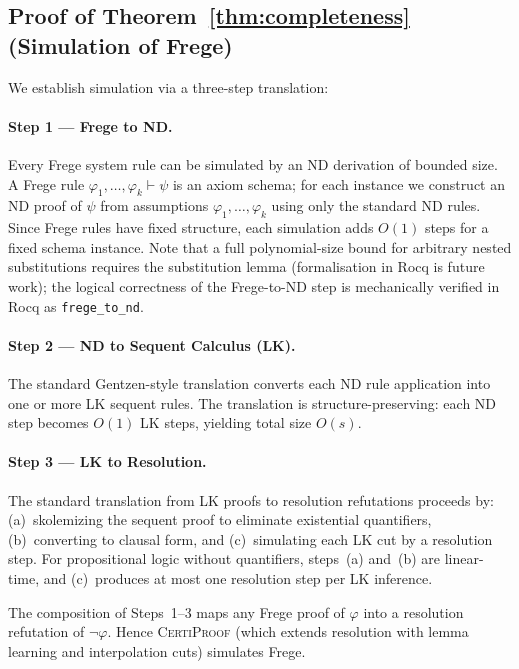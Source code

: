 \documentclass[acmtocl,review,anonymous]{acmart}
\newcommand{\CP}{\textsc{CertiProof}}
\begin{document}
\subsection{Proof of Theorem~\ref{thm:completeness}
  (Simulation of Frege)}

We establish simulation via a three-step translation:

\paragraph{Step 1 --- Frege to ND.}
Every Frege system rule can be simulated by an ND derivation of
bounded size.  A Frege rule
$\varphi_1, \ldots, \varphi_k \vdash \psi$ is an axiom schema; for each
instance we construct an ND proof of $\psi$ from assumptions
$\varphi_1, \ldots, \varphi_k$ using only the standard ND rules.
Since Frege rules have fixed structure, each simulation adds $O(1)$ steps
for a fixed schema instance.  Note that a full polynomial-size bound
for arbitrary nested substitutions requires the substitution lemma
(formalisation in Rocq is future work);
the logical correctness of the Frege-to-ND step is mechanically
verified in Rocq as \texttt{frege\_to\_nd}.

\paragraph{Step 2 --- ND to Sequent Calculus (LK).}
The standard Gentzen-style translation converts each ND rule application
into one or more LK sequent rules.  The translation is structure-preserving:
each ND step becomes $O(1)$ LK steps, yielding total size $O(s)$.

\paragraph{Step 3 --- LK to Resolution.}
The standard translation from LK proofs to resolution refutations
proceeds by: (a)~skolemizing the sequent proof to eliminate
existential quantifiers, (b)~converting to clausal form, and
(c)~simulating each LK cut by a resolution step.  For propositional
logic without quantifiers, steps~(a) and~(b) are linear-time, and
(c)~produces at most one resolution step per LK inference.

The composition of Steps~1--3 maps any Frege proof of $\varphi$ into
a resolution refutation of $\neg\varphi$.
Hence \CP{} (which extends resolution with lemma learning and
interpolation cuts) simulates Frege.
\end{document}
